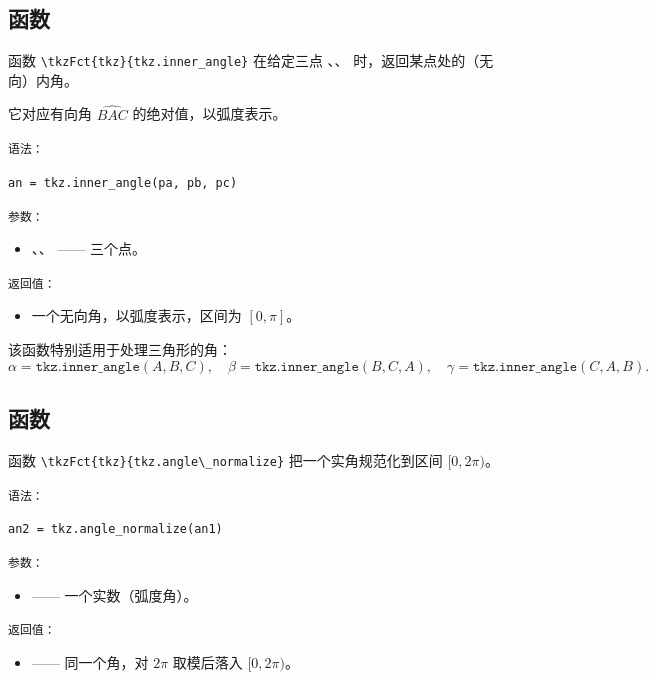 \subsection{函数 }
\label{sub:tkz_inner_angle}

函数 \verb|\tkzFct{tkz}{tkz.inner_angle}| 在给定三点 、、 时，返回某点处的（无向）内角。

它对应有向角 $\widehat{BAC}$ 的绝对值，以弧度表示。

\medskip
\texttt{语法：}

\begin{mybox}
\verb|an = tkz.inner_angle(pa, pb, pc)|
\end{mybox}

\texttt{参数：}
\begin{itemize}
  \item {}、、 —— 三个点。
\end{itemize}

\texttt{返回值：}
\begin{itemize}
  \item 一个无向角，以弧度表示，区间为 $[0, \pi]$。
\end{itemize}

\medskip
该函数特别适用于处理三角形的角：
\[
\alpha = \texttt{tkz.inner\_angle}(A,B,C),\quad
\beta  = \texttt{tkz.inner\_angle}(B,C,A),\quad
\gamma = \texttt{tkz.inner\_angle}(C,A,B).
\]




\subsection{函数 }
\label{sub:tkz_angle_normalize}

函数 \verb|\tkzFct{tkz}{tkz.angle\_normalize}| 把一个实角规范化到区间
$[0, 2\pi)$。

\medskip
\texttt{语法：}

\verb|an2 = tkz.angle_normalize(an1)|


\texttt{参数：}
\begin{itemize}
  \item {} —— 一个实数（弧度角）。
\end{itemize}

\texttt{返回值：}
\begin{itemize}
  \item {} —— 同一个角，对 $2\pi$ 取模后落入 $[0, 2\pi)$。
\end{itemize}

